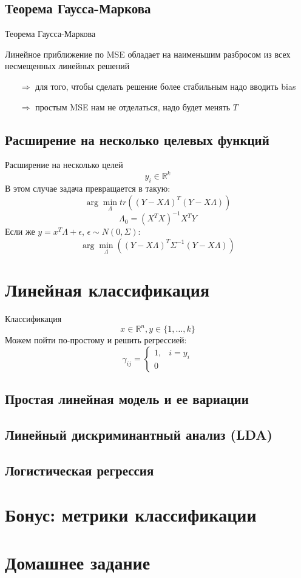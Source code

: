 \documentclass[14pt, fleqn, xcolor={dvipsnames, table}]{beamer}
\begin{document}
\subsection{Теорема Гаусса-Маркова}
\begin{frame}{Теорема Гаусса-Маркова}
\begin{theorem}[]
Линейное приближение по MSE обладает на наименьшим разбросом из всех несмещенных линейных решений
\end{theorem}
\begin{itemize}
\item[$\Rightarrow$] для того, чтобы сделать решение более стабильным надо вводить bias
\item[$\Rightarrow$] простым MSE нам не отделаться, надо будет менять $T$
\end{itemize}
\end{frame}

\subsection{Расширение на несколько целевых функций}
\begin{frame}{Расширение на несколько целей}
$$
y_i \in \mathbb{R}^k
$$
В этом случае задача превращается в такую:
$$
\arg \min_\Lambda tr\left((Y - X\Lambda)^T(Y - X\Lambda)\right)
$$
$$
\Lambda_0 = \left(X^TX\right)^{-1} X^TY
$$
Если же $y = x^T\Lambda + \epsilon$, $\epsilon \sim N(0, \Sigma)$:
$$
\arg \min_\Lambda \left((Y - X\Lambda)^T\Sigma^{-1}(Y - X\Lambda)\right)
$$
\end{frame}

\section{Линейная классификация}
\begin{frame}{Классификация}
$$
x \in \mathbb{R}^n, y \in \{1,\ldots, k\}
$$
Можем пойти по-простому и решить регрессией:
$$
\gamma_{ij} = \left\{\begin{array}{ll}
1,& i = y_i \\
0 
\end{array}\right.
$$
\end{frame}

\subsection{Простая линейная модель и ее вариации}
\subsection{Линейный дискриминантный анализ (LDA)}
\subsection{Логистическая регрессия}
\section{Бонус: метрики классификации}
\section{Домашнее задание}
\end{document}
